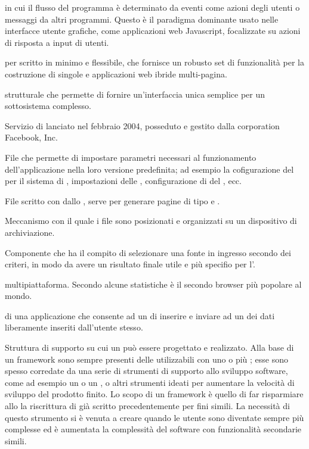 { in cui il flusso del programma è determinato da eventi come azioni degli utenti o messaggi da altri programmi. Questo è il paradigma dominante usato nelle interfacce utente grafiche, come applicazioni web Javascript, focalizzate su azioni di risposta a input di utenti.}


{ per  scritto in  minimo e flessibile, che fornisce un robusto set di funzionalità per la costruzione di singole e applicazioni web ibride multi-pagina.}




{ strutturale che permette di fornire un'interfaccia unica semplice per un sottosistema complesso.}


{Servizio di  lanciato nel febbraio 2004, posseduto e gestito dalla corporation Facebook, Inc.}

{File che permette di impostare parametri necessari al funzionamento dell'applicazione nella loro versione predefinita; ad esempio la cofigurazione del  per il sistema di , impostazioni delle , configurazione di  del , ecc.}

{File scritto con   dallo , serve per generare pagine di tipo  e .}

{Meccanismo con il quale i file sono posizionati e organizzati su un dispositivo di archiviazione.}

{Componente che ha il compito di selezionare una fonte in ingresso secondo dei criteri, in modo da avere un risultato finale utile e più specifio per l'.}

{  multipiattaforma. Secondo alcune statistiche è il secondo browser più popolare al mondo.}

{ di una applicazione che consente ad un  di inserire e inviare ad un  dei dati liberamente inseriti dall'utente stesso.}

{Struttura di supporto su cui un  può essere progettato e realizzato. Alla base di un framework sono sempre presenti delle  utilizzabili con uno o più ; esse sono spesso corredate da una serie di strumenti di supporto allo sviluppo software, come ad esempio un  o un , o altri strumenti ideati per aumentare la velocità di sviluppo del prodotto finito.
Lo scopo di un framework è quello di far risparmiare allo  la riscrittura di  già scritto precedentemente per fini simili. La necessità di questo strumento si è venuta a creare quando le  utente sono diventate sempre più complesse ed è aumentata la complessità del software con funzionalità secondarie simili.}

